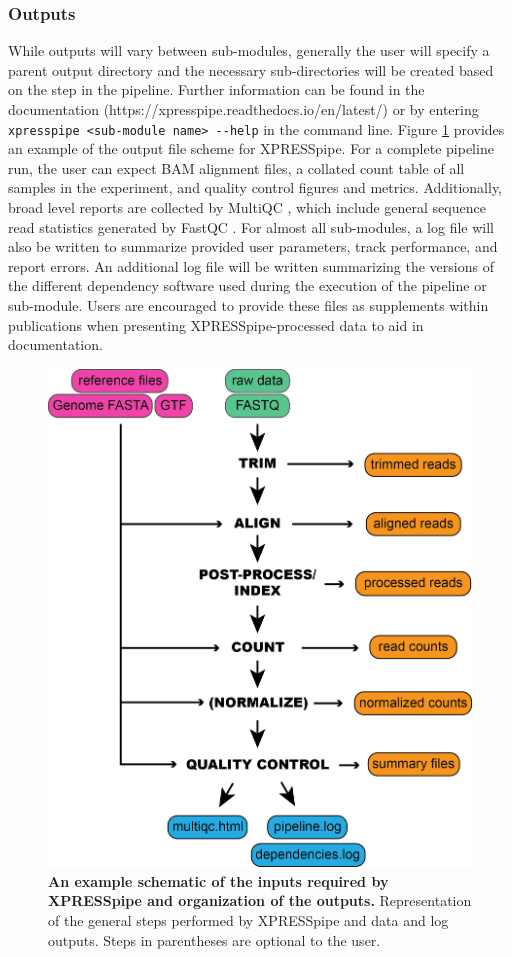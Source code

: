 \documentclass[10pt, oneside]{article}
\begin{document}
\subsubsection{Outputs}
While outputs will vary between sub-modules, generally the user will specify a parent output directory and the necessary sub-directories will be created based on the step in the pipeline. Further information can be found in the documentation (https://xpresspipe.readthedocs.io/en/latest/) or by entering \texttt{xpresspipe \textless sub-module name\textgreater \ -{}-help} in the command line. Figure \ref{fig:outputs} provides an example of the output file scheme for XPRESSpipe. For a complete pipeline run, the user can expect BAM alignment files, a collated count table of all samples in the experiment, and quality control figures and metrics. Additionally, broad level reports are collected by MultiQC \cite{multiqc}, which include general sequence read statistics generated by FastQC \cite{fastqc}. For almost all sub-modules, a log file will also be written to summarize provided user parameters, track performance, and report errors. An additional log file will be written summarizing the versions of the different dependency software used during the execution of the pipeline or sub-module. Users are encouraged to provide these files as supplements within publications when presenting XPRESSpipe-processed data to aid in documentation.

\begin{figure}
\centering
  \includegraphics[width=120mm]{figures/xpresspipe_figure1.png}
  \caption{\textbf{An example schematic of the inputs required by XPRESSpipe and organization of the outputs.} Representation of the general steps performed by XPRESSpipe and data and log outputs. Steps in parentheses are optional to the user.}
  \label{fig:outputs}
\end{figure}
\end{document}
